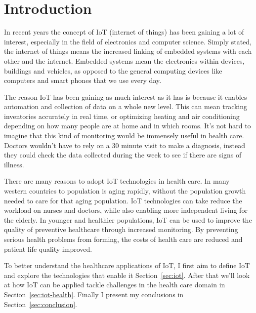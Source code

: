 \section{Introduction}

In recent years the concept of IoT (internet of things) has been gaining a lot
of interest, especially in the field of electronics and computer science.
Simply stated, the internet of things means the increased linking of embedded
systems with each other and the internet. Embedded systems mean the electronics
within devices, buildings and vehicles, as opposed to the general computing
devices like computers and smart phones that we use every day.

The reason IoT has been gaining as much interest as it has is because it
enables automation and collection of data on a whole new level. This can mean
tracking inventories accurately in real time, or optimizing heating and air
conditioning depending on how many people are at home and in which rooms. It's
not hard to imagine that this kind of monitoring would be immensely useful in
health care. Doctors wouldn't have to rely on a 30 minute visit to make a
diagnosis, instead they could check the data collected during the week to see
if there are signs of illness.

There are many reasons to adopt IoT technologies in health care. In many
western countries to population is aging rapidly, without the population growth
needed to care for that aging population. IoT technologies can take reduce the
workload on nurses and doctors, while also enabling more independent living for
the elderly. In younger and healthier populations, IoT can be used to improve
the quality of preventive healthcare through increased monitoring. By
preventing serious health problems from forming, the costs of health care are
reduced and patient life quality improved.~\cite{Bui2011}

To better understand the healthcare applications of IoT, I first aim to define IoT and
explore the technologies that enable it Section~\ref{sec:iot}. After that we'll
look at how IoT can be applied tackle challenges in the health care domain in
Section~\ref{sec:iot-health}.  Finally I present my conclusions in
Section~\ref{sec:conclusion}.
